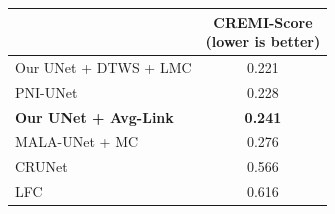 \begin{figure}[t]
\begin{minipage}[t]{0.56\textwidth}
\begin{tabular}[t]{l|l|c}
        \end{tabular}
    \label{tab:results_cremi_train}
\end{minipage}\hfill
\begin{minipage}[t]{0.4\textwidth}
    \centering
    \scriptsize
        \begin{tabular}[t]{l|c}
         & \makecell{CREMI-Score \\(lower is better)}  \\ \midrule
Our UNet + DTWS + LMC &  0.221\\
PNI-UNet \cite{lee2017superhuman} & 0.228 \\
\textbf{Our UNet + \algname{} Avg-Link} & \textbf{0.241} \\
MALA-UNet + MC \cite{funke2018large} & 0.276 \\
CRUNet \cite{zeng2017deepem3d} & 0.566  \\
LFC \cite{parag2017anisotropic} & 0.616  \\
        \end{tabular}
        \vspace*{1.1em}
    \label{tab:results_cremi_test}
\end{minipage}
\end{figure}
\captionsetup[subfigure]{justification=centering, singlelinecheck=off}
